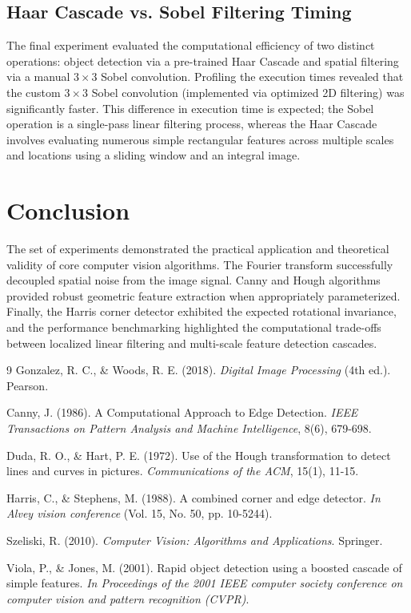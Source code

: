 \documentclass[11pt,a4paper]{article}
\begin{document}
\subsection{Haar Cascade vs. Sobel Filtering Timing}
The final experiment evaluated the computational efficiency of two distinct operations: object detection via a pre-trained Haar Cascade \cite{viola2001} and spatial filtering via a manual $3 \times 3$ Sobel convolution. Profiling the execution times revealed that the custom $3 \times 3$ Sobel convolution (implemented via optimized 2D filtering) was significantly faster. This difference in execution time is expected; the Sobel operation is a single-pass linear filtering process, whereas the Haar Cascade involves evaluating numerous simple rectangular features across multiple scales and locations using a sliding window and an integral image.

\section{Conclusion}
The set of experiments demonstrated the practical application and theoretical validity of core computer vision algorithms. The Fourier transform successfully decoupled spatial noise from the image signal. Canny and Hough algorithms provided robust geometric feature extraction when appropriately parameterized. Finally, the Harris corner detector exhibited the expected rotational invariance, and the performance benchmarking highlighted the computational trade-offs between localized linear filtering and multi-scale feature detection cascades.

\begin{thebibliography}{9}
Gonzalez, R. C., \& Woods, R. E. (2018). 
\textit{Digital Image Processing} (4th ed.). Pearson.

Canny, J. (1986). 
A Computational Approach to Edge Detection. 
\textit{IEEE Transactions on Pattern Analysis and Machine Intelligence}, 8(6), 679-698.

Duda, R. O., \& Hart, P. E. (1972). 
Use of the Hough transformation to detect lines and curves in pictures. 
\textit{Communications of the ACM}, 15(1), 11-15.

Harris, C., \& Stephens, M. (1988). 
A combined corner and edge detector. 
\textit{In Alvey vision conference} (Vol. 15, No. 50, pp. 10-5244).

Szeliski, R. (2010). 
\textit{Computer Vision: Algorithms and Applications}. Springer.

Viola, P., \& Jones, M. (2001). 
Rapid object detection using a boosted cascade of simple features. 
\textit{In Proceedings of the 2001 IEEE computer society conference on computer vision and pattern recognition (CVPR)}.
\end{thebibliography}
\end{document}
